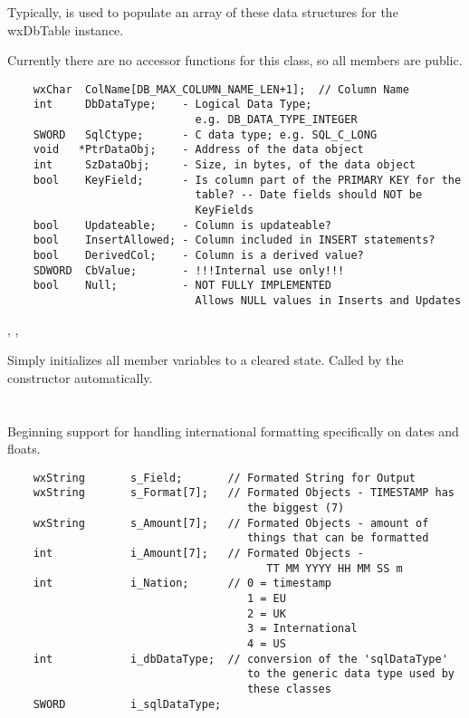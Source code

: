 Typically,  is used to
populate an array of these data structures for the wxDbTable instance.

Currently there are no accessor functions for this class, so all members are
public.

\begin{verbatim}
    wxChar  ColName[DB_MAX_COLUMN_NAME_LEN+1];  // Column Name
    int     DbDataType;    - Logical Data Type;
                             e.g. DB_DATA_TYPE_INTEGER
    SWORD   SqlCtype;      - C data type; e.g. SQL_C_LONG
    void   *PtrDataObj;    - Address of the data object
    int     SzDataObj;     - Size, in bytes, of the data object
    bool    KeyField;      - Is column part of the PRIMARY KEY for the
                             table? -- Date fields should NOT be
                             KeyFields
    bool    Updateable;    - Column is updateable?
    bool    InsertAllowed; - Column included in INSERT statements?
    bool    DerivedCol;    - Column is a derived value?
    SDWORD  CbValue;       - !!!Internal use only!!!
    bool    Null;          - NOT FULLY IMPLEMENTED
                             Allows NULL values in Inserts and Updates
\end{verbatim}


,
, 

\label{wxdbcoldefinitialize}

Simply initializes all member variables to a cleared state.  Called by
the constructor automatically.

\section{}\label{wxdbcolfor}

Beginning support for handling international formatting specifically on dates
and floats.

\begin{verbatim}
    wxString       s_Field;       // Formated String for Output
    wxString       s_Format[7];   // Formated Objects - TIMESTAMP has
                                     the biggest (7)
    wxString       s_Amount[7];   // Formated Objects - amount of
                                     things that can be formatted
    int            i_Amount[7];   // Formated Objects -
                                        TT MM YYYY HH MM SS m
    int            i_Nation;      // 0 = timestamp
                                     1 = EU
                                     2 = UK
                                     3 = International
                                     4 = US
    int            i_dbDataType;  // conversion of the 'sqlDataType'
                                     to the generic data type used by
                                     these classes
    SWORD          i_sqlDataType;
\end{verbatim}

